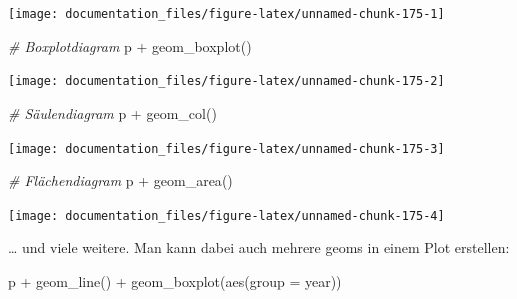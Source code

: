\documentclass[
]{article}
\newenvironment{Shaded}{\begin{snugshade}}{\end{snugshade}}
\newcommand{\AttributeTok}[1]{\textcolor[rgb]{0.77,0.63,0.00}{#1}}
\newcommand{\CommentTok}[1]{\textcolor[rgb]{0.56,0.35,0.01}{\textit{#1}}}
\newcommand{\FunctionTok}[1]{\textcolor[rgb]{0.00,0.00,0.00}{#1}}
\newcommand{\NormalTok}[1]{#1}
\newcommand{\SpecialCharTok}[1]{\textcolor[rgb]{0.00,0.00,0.00}{#1}}
\begin{document}
\begin{center}\texttt{[image: documentation\_files/figure-latex/unnamed-chunk-175-1]} \end{center}

\begin{Shaded}
\begin{Highlighting}[]
\CommentTok{\# Boxplotdiagram}
\NormalTok{p }\SpecialCharTok{+} \FunctionTok{geom\_boxplot}\NormalTok{()}
\end{Highlighting}
\end{Shaded}

\begin{center}\texttt{[image: documentation\_files/figure-latex/unnamed-chunk-175-2]} \end{center}

\begin{Shaded}
\begin{Highlighting}[]
\CommentTok{\# Säulendiagram}
\NormalTok{p }\SpecialCharTok{+} \FunctionTok{geom\_col}\NormalTok{()}
\end{Highlighting}
\end{Shaded}

\begin{center}\texttt{[image: documentation\_files/figure-latex/unnamed-chunk-175-3]} \end{center}

\begin{Shaded}
\begin{Highlighting}[]
\CommentTok{\# Flächendiagram}
\NormalTok{p }\SpecialCharTok{+} \FunctionTok{geom\_area}\NormalTok{()}
\end{Highlighting}
\end{Shaded}

\begin{center}\texttt{[image: documentation\_files/figure-latex/unnamed-chunk-175-4]} \end{center}

\ldots{} und viele weitere. Man kann dabei auch mehrere geoms in einem Plot erstellen:

\begin{Shaded}
\begin{Highlighting}[]
\NormalTok{p }\SpecialCharTok{+} \FunctionTok{geom\_line}\NormalTok{() }\SpecialCharTok{+} \FunctionTok{geom\_boxplot}\NormalTok{(}\FunctionTok{aes}\NormalTok{(}\AttributeTok{group =}\NormalTok{ year))}
\end{Highlighting}
\end{Shaded}
\end{document}
